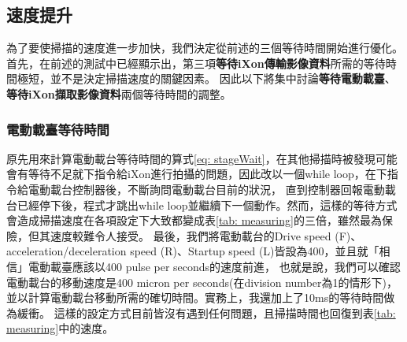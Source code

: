 \documentclass[12pt]{article}
\begin{document}
    \subsection{速度提升}
    為了要使掃描的速度進一步加快，我們決定從前述的三個等待時間開始進行優化。首先，在前述的測試中已經顯示出，第三項\textbf{等待iXon傳輸影像資料}所需的等待時間極短，並不是決定掃描速度的關鍵因素。
    因此以下將集中討論\textbf{等待電動載臺}、\textbf{等待iXon擷取影像資料}兩個等待時間的調整。
    \subsubsection{電動載臺等待時間}
    原先用來計算電動載台等待時間的算式\ref{eq: stageWait}，在其他掃描時被發現可能會有等待不足就下指令給iXon進行拍攝的問題，因此改以一個while loop，在下指令給電動載台控制器後，不斷詢問電動載台目前的狀況，
    直到控制器回報電動載台已經停下後，程式才跳出while loop並繼續下一個動作。然而，這樣的等待方式會造成掃描速度在各項設定下大致都變成表\ref{tab: measuring}的三倍，雖然最為保險，但其速度較難令人接受。
    最後，我們將電動載台的Drive speed (F)、acceleration/deceleration speed (R)、Startup speed (L)皆設為400，並且就「相信」電動載臺應該以400 pulse per seconds的速度前進，
    也就是說，我們可以確認電動載台的移動速度是400 micron per seconds(在division number為1的情形下)，並以計算電動載台移動所需的確切時間。實務上，我還加上了10ms的等待時間做為緩衝。
    這樣的設定方式目前皆沒有遇到任何問題，且掃描時間也回復到表\ref{tab: measuring}中的速度。
\end{document}
